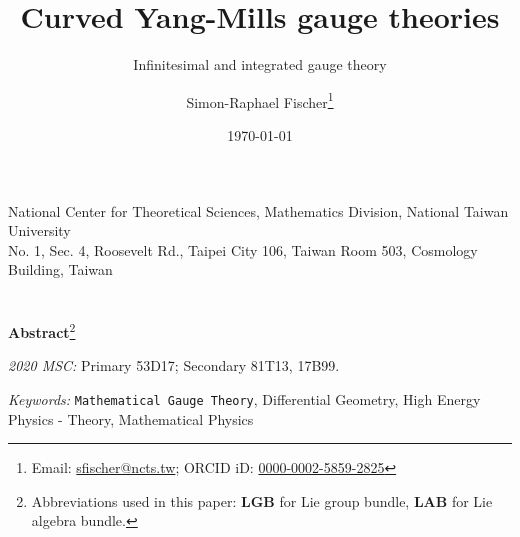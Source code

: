 \documentclass[a4paper,oneside,11pt,bibliography=totoc]{scrartcl}
\theoremstyle{plain}
\theoremstyle{remark}
\theoremstyle{definition}
\begin{document}
\renewcommand{\thefootnote}{\fnsymbol{footnote}}

\begin{titlepage}

\author{Simon-Raphael Fischer\footnote{Email: \href{mailto:sfischer@ncts.tw}{sfischer@ncts.tw}; ORCID iD: \href{https://orcid.org/0000-0002-5859-2825}{0000-0002-5859-2825}} }
\title{Curved Yang-Mills gauge theories} 
\subtitle{Infinitesimal and integrated gauge theory}
\date{\today} 
\maketitle
\thispagestyle{empty}

\begin{center}
National Center for Theoretical Sciences, Mathematics Division, National Taiwan University\\
No. 1, Sec. 4, Roosevelt Rd., Taipei City 106, Taiwan Room 503, Cosmology Building, Taiwan
\ \\
\ \\
\ \\
\textbf{Abstract}\footnote[2]{Abbreviations used in this paper: \textbf{LGB} for Lie group bundle, \textbf{LAB} for Lie algebra bundle.}
\begin{abstract}
  \small{
}
 \end{abstract}
\end{center}

\textit{2020 MSC:} Primary 53D17; Secondary 81T13, 17B99.

\textit{Keywords:} \texttt{Mathematical Gauge Theory}, Differential Geometry, High Energy Physics - Theory, Mathematical Physics

\end{titlepage}




\tableofcontents





\renewcommand{\thefootnote}{\arabic{footnote}}
%
\setlength{\parindent}{12 pt}
\end{document}
